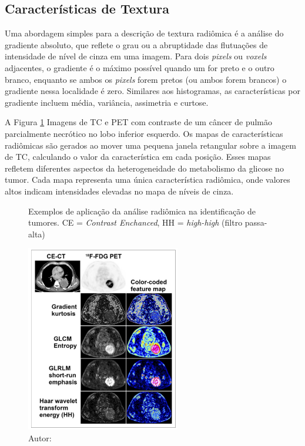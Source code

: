 \subsection{Características de Textura}

Uma abordagem simples para a descrição de textura radiômica é a análise do gradiente absoluto, que reflete o grau ou a abruptidade das flutuações de intensidade de nível de cinza em uma imagem. Para dois \textit{pixels} ou \textit{voxels} adjacentes, o gradiente é o máximo possível quando um for preto e o outro branco, enquanto se ambos os \textit{pixels} forem pretos (ou ambos forem brancos) o gradiente nessa localidade é zero. Similares aos histogramas, as características por gradiente incluem média, variância, assimetria e curtose.

A Figura \ref{fig:fig001} Imagens de \gls{TC} e \gls{PET} com contraste de um câncer de pulmão parcialmente necrótico no lobo inferior esquerdo. Os mapas de características radiômicas são gerados ao mover uma pequena janela retangular sobre a imagem de \gls{TC}, calculando o valor da característica em cada posição. Esses mapas refletem diferentes aspectos da heterogeneidade do metabolismo da glicose no tumor. Cada mapa representa uma única característica radiômica, onde valores altos indicam intensidades elevadas no mapa de níveis de cinza.


\begin{figure}[htbp]
    \centering
    \caption{Exemplos de aplicação da análise radiômica na identificação de tumores. 
    \newline CE = \textit{Contrast Enchanced}, HH = \textit{high-high} (filtro passa-alta)}
    \includegraphics[width=0.6\textwidth]{figures/fig001.png}
    \caption*{Autor: \cite{mayerhoeferIntroductionRadiomics2020}}
    \label{fig:fig001}
\end{figure}

